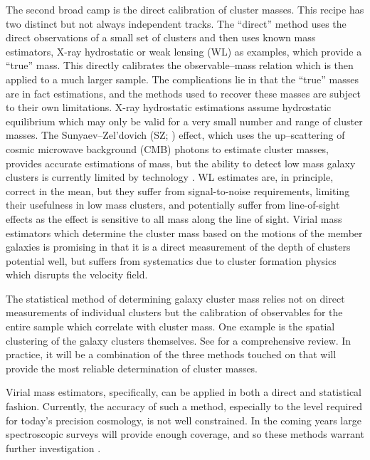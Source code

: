 The second broad camp is the direct calibration of cluster masses. This recipe has two distinct but not always independent tracks. The ``direct'' method uses the direct observations of a small set of clusters and then uses known mass estimators, X-ray hydrostatic or weak lensing (WL) as examples, which provide a ``true'' mass. This directly calibrates the observable--mass relation which is then applied to a much larger sample. The complications lie in that the ``true'' masses are in fact estimations, and the methods used to recover these masses are subject to their own limitations. X-ray hydrostatic estimations assume hydrostatic equilibrium  which may only be valid for a very small number and range of cluster masses. The Sunyaev--Zel’dovich (SZ; \citealt{Sunyaev1972}) effect, which uses the up--scattering of cosmic microwave background (CMB) photons to estimate cluster masses, provides accurate estimations of mass, but the ability to detect low mass galaxy clusters is currently limited by technology . WL estimates are, in principle, correct in the mean, but they suffer from signal-to-noise requirements, limiting their usefulness in low mass clusters, and potentially suffer from line-of-sight effects as the effect is sensitive to all mass along the line of sight. Virial mass estimators which determine the cluster mass based on the motions of the member galaxies is promising in that it is a direct measurement of the depth of clusters potential well, but suffers from systematics due to cluster formation physics which disrupts the velocity field.
 
The statistical method of determining galaxy cluster mass relies not on direct measurements of individual clusters but the calibration of observables for the entire sample which correlate with cluster mass. One example is the spatial clustering of the galaxy clusters themselves. See \cite{Weinberg2013} for a comprehensive review. In practice, it will be a combination of the three methods touched on that will provide the most reliable determination of cluster masses. 

Virial mass estimators, specifically, can be applied in both a direct and statistical fashion. Currently, the accuracy of such a method, especially to the level required for today's precision cosmology, is not well constrained. In the coming years large spectroscopic surveys will provide enough coverage, and so these methods warrant further investigation .

